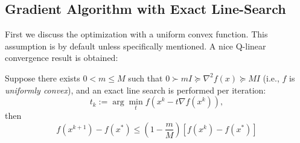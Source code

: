 \subsection{Gradient Algorithm with Exact Line-Search}
First we discuss the optimization with a uniform convex function. This assumption is by default unless specifically mentioned. A nice Q-linear convergence result is obtained:
\begin{theorem}\label{The:5:1}
Suppose there exists $0< m\le M$ such that
$0\succ mI\succeq \nabla^2f(x)\succeq MI$ (i.e., $f$ is \emph{uniformly convex}), and an exact line search is performed per iteration:
\[
t_k:=\arg\min_tf(x^k - t\nabla f(x^k)),
\]
then
\begin{equation}\label{Eq:5:1}
f(x^{k+1}) - f(x^*)\le \left(1-\frac{m}{M}\right)[f(x^k) - f(x^*)]
\end{equation}
\end{theorem}
